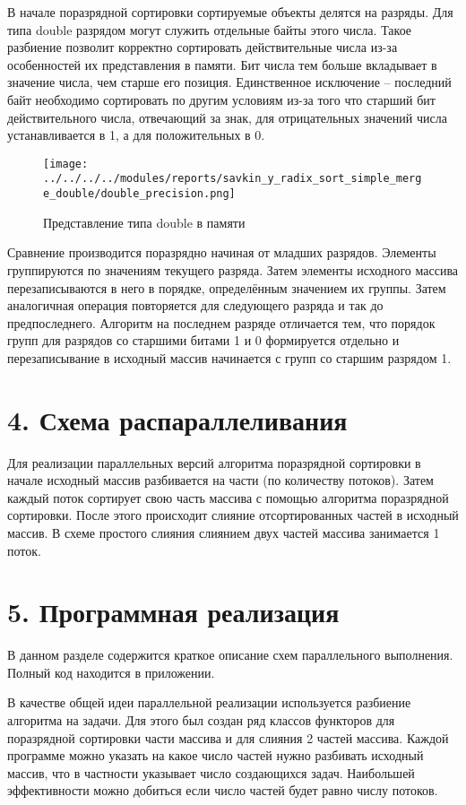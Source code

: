 \documentclass{report}
\begin{document}
    \par В начале поразрядной сортировки сортируемые объекты делятся на разряды. Для типа double разрядом могут служить отдельные байты этого числа.
         Такое разбиение позволит корректно сортировать действительные числа из-за особенностей их представления в памяти.
         Бит числа тем больше вкладывает в значение числа, чем старше его позиция.
         Единственное исключение -- последний байт необходимо сортировать по другим условиям из-за того что старший бит действительного числа, отвечающий за знак, для отрицательных значений числа устанавливается в 1, а для положительных в 0.
    \begin{figure}[htbp]
        \centering
        \texttt{[image: ../../../../modules/reports/savkin\_y\_radix\_sort\_simple\_merge\_double/double\_precision.png]}
        \caption{Представление типа double в памяти}
    \end{figure}
    \par Сравнение производится поразрядно начиная от младших разрядов. Элементы группируются по значениям текущего разряда.
         Затем элементы исходного массива перезаписываются в него в порядке, определённым значением их группы.
         Затем аналогичная операция повторяется для следующего разряда и так до предпоследнего.
         Алгоритм на последнем разряде отличается тем, что порядок групп для разрядов со старшими битами 1 и 0 формируется отдельно и перезаписывание в исходный массив начинается с групп со старшим разрядом 1.


    \newpage
    \section*{4. Схема распараллеливания}
    \par Для реализации параллельных версий алгоритма поразрядной сортировки в начале исходный массив разбивается на части (по количеству потоков).
         Затем каждый поток сортирует свою часть массива с помощью алгоритма поразрядной сортировки.
         После этого происходит слияние отсортированных частей в исходный массив. В схеме простого слияния слиянием двух частей массива занимается 1 поток.


    \newpage
    \section*{5. Программная реализация}
    \par В данном разделе содержится краткое описание схем параллельного выполнения. Полный код находится в приложении.
    \par В качестве общей идеи параллельной реализации используется разбиение алгоритма на задачи. Для этого был создан ряд классов функторов для поразрядной сортировки части массива и для слияния 2 частей массива.
         Каждой программе можно указать на какое число частей нужно разбивать исходный массив, что в частности указывает число создающихся задач.
         Наибольшей эффективности можно добиться если число частей будет равно числу потоков.
\end{document}
